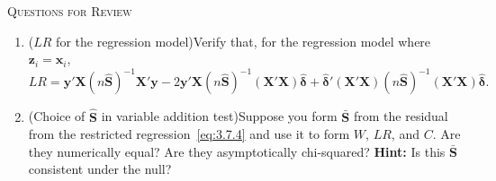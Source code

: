 \medskip\noindent
\textsc{Questions for Review}

\begin{enumerate}
\item ($LR$ for the regression model)\quad Verify that, for the regression model where
  $\mathbf{z}_i = \mathbf{x}_i$,
  \[
    LR = \mathbf{y}'\mathbf{X}(n\hat{\mathbf{S}})^{-1}\mathbf{X}'\mathbf{y}
    - 2\mathbf{y}'\mathbf{X}(n\hat{\mathbf{S}})^{-1}(\mathbf{X}'\mathbf{X})
    \hat{\boldsymbol{\delta}}
    + \hat{\boldsymbol{\delta}}'(\mathbf{X}'\mathbf{X})(n\hat{\mathbf{S}})^{-1}
    (\mathbf{X}'\mathbf{X})\hat{\boldsymbol{\delta}}.
  \]

\item (Choice of $\hat{\mathbf{S}}$ in variable addition test)\quad Suppose you form
  $\bar{\mathbf{S}}$ from the residual from the restricted regression~\eqref{eq:3.7.4} and use it to
  form $W$, $LR$, and $C$.  Are they numerically equal?  Are they asymptotically chi-squared?
  \textbf{Hint:} Is this $\bar{\mathbf{S}}$ consistent under the null?
\end{enumerate}
